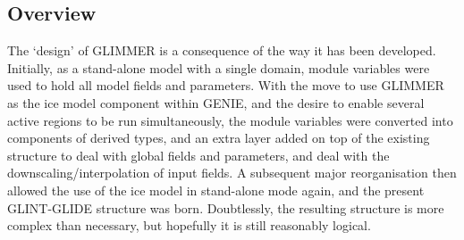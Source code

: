 \subsection{Overview}
%
The `design' of GLIMMER is a consequence of the way it has been
developed. Initially, as a stand-alone model with a single domain, module
variables were used to hold all model fields and parameters. With the move to
use GLIMMER as the ice model component within GENIE, and the desire to enable
several active regions to be run simultaneously, the module variables were
converted into components of derived types, and an extra layer added on top of
the existing structure to deal with global fields and parameters, and deal
with the downscaling/interpolation of input fields. A subsequent major
reorganisation then allowed the use of the ice model in stand-alone mode
again, and the present GLINT-GLIDE structure was born. Doubtlessly, the
resulting structure is more complex than necessary, but hopefully it is still
reasonably logical.


